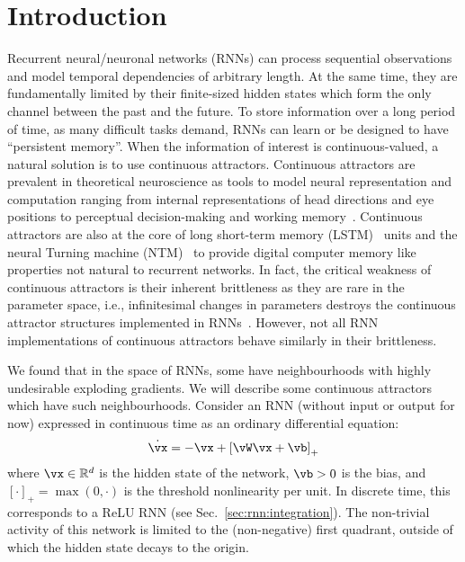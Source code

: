 \documentclass{article}
\newcounter{ct}
\newcommand{\reals}{\mathbb{R}}
\theoremstyle{definition}
\theoremstyle{remark}
\begin{document}
\section{Introduction}

Recurrent neural/neuronal networks (RNNs) can process sequential observations and model temporal dependencies of arbitrary length.
At the same time, they are fundamentally limited by their finite-sized hidden states which form the only channel between the past and the future.
To store information over a long period of time, as many difficult tasks demand, RNNs can learn or be designed to have ``persistent memory''.
When the information of interest is continuous-valued, a natural solution is to use continuous attractors.
Continuous attractors are prevalent in theoretical neuroscience as tools to model neural representation and computation ranging from internal representations of head directions and eye positions to perceptual decision-making and working memory~\cite{Khona2022}.
Continuous attractors are also at the core of long short-term memory (LSTM)~\cite{Greff2017} units and the neural Turning machine (NTM)~\cite{Graves2014} to provide digital computer memory like properties not natural to recurrent networks. %
In fact, the critical weakness of continuous attractors is their inherent brittleness as they are rare in the parameter space, i.e., infinitesimal changes in parameters destroys the continuous attractor structures implemented in RNNs~\cite{seung1996,Renart2003}.
However, not all RNN implementations of continuous attractors behave similarly in their brittleness.

We found that in the space of RNNs, some have neighbourhoods with highly undesirable exploding gradients. We will describe some continuous attractors which have such neighbourhoods.
Consider an RNN (without input or output for now) expressed in continuous time as an ordinary differential equation:
\begin{align}\label{eq:TLN}
    \dot{\vx} = -\vx + \left[ \vW \vx + \vb \right]_{+}
\end{align}
where $\vx \in \reals^d$ is the hidden state of the network, $\vb > 0$ is the bias, and $[\cdot]_{+} = \max(0,\cdot)$ is the threshold nonlinearity per unit.
In discrete time, this corresponds to a ReLU RNN (see Sec.~\ref{sec:rnn:integration}).
The non-trivial activity of this network is limited to the (non-negative) first quadrant, outside of which the hidden state decays to the origin.
\end{document}
